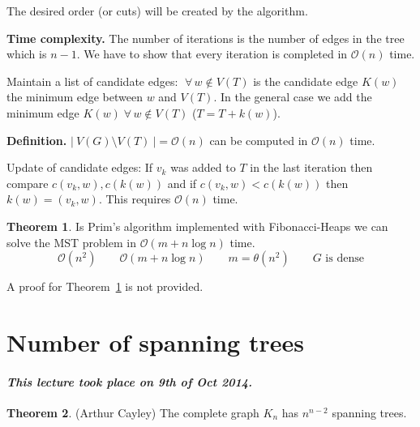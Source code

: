 \documentclass[a4paper]{article}
\theoremstyle{definition}
\newtheorem{theorem}{Theorem}
\newcommand{\card}[1]{\left|\:\!#1\:\!\right|}
\newcommand{\dateref}[1]{\paragraph{\textit{This lecture took place on #1.}}}
\newcommand{\fall}{\;\forall\,}
\begin{document}
The desired order (or cuts) will be created by the algorithm.

\textbf{Time complexity.} The number of iterations is the number of edges in the tree which is $n-1$.
We have to show that every iteration is completed in $\mathcal{O}(n)$ time.

Maintain a list of candidate edges: $\fall w \notin V(T)$ is the candidate edge $K(w)$ the minimum edge between $w$ and $V(T)$.
In the general case we add the minimum edge $K(w) \fall w \notin V(T)$ ($T = T + k(w)$).

\textbf{Definition.}
  $\card{V(G) \setminus V(T)} = \mathcal{O}(n)$ can be computed in $\mathcal{O}(n)$ time.

Update of candidate edges: If $v_k$ was added to $T$ in the last iteration then compare $c(v_k, w), c(k(w))$ and if $c(v_k, w) < c(k(w))$ then $k(w) = (v_k, w)$. This requires $\mathcal{O}(n)$ time.

\begin{theorem}\label{satz-2.7}
  Is Prim's algorithm implemented with Fibonacci-Heaps we can solve the MST problem in $\mathcal{O}(m + n\log{n})$ time.
  \[
    \mathcal{O}(n^2) \qquad \mathcal{O}(m + n\log{n}) \qquad m = \theta(n^2) \qquad G \text{ is dense}
  \]
\end{theorem}

A proof for Theorem~\ref{satz-2.7} is not provided.

\section{Number of spanning trees}

\dateref{9th of Oct 2014}

\begin{theorem}\label{satz-2.8}
  (Arthur Cayley)
  The complete graph $K_n$ has $n^{n-2}$ spanning trees.
\end{theorem}
\end{document}
